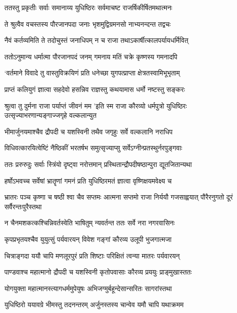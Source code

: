 \twolineshloka
{ततस्तु प्रकृतीः सर्वाः समानाय्य युधिष्ठिरः}
{सर्वमाचष्ट राजर्षिकीर्षितमथात्मनः}


\twolineshloka
{ते श्रुत्वैव वचस्तस्य पौरजानपदा जनाः}
{भृशमुद्विग्रमनसो नाभ्यनन्दन्त तद्वचः}


\twolineshloka
{नैवं कर्तव्यमिति ते तदोचुस्तं जनाधिपम्}
{न च राजा तथाऽकार्षीत्कालपर्यायधर्मिवित्}


\twolineshloka
{ततोऽनुमान्य धर्मात्मा पौरजानपदं जनम्}
{गमनाय मतिं चक्रे कृष्णस्य गमनादपि}


\twolineshloka
{`वर्तमाने विवादे तु वास्तुविक्रयिणं प्रति}
{धनेच्छा युगपत्प्राप्ता क्षेत्रतस्वामिभूभृताम्}


\twolineshloka
{प्राप्तं कलियुगं ज्ञात्वा सहदेवो हसन्निव}
{राज्ञस्तु कथयामास धर्मो नष्टस्तु सङ्करः}


\threelineshloka
{श्रुत्वा तु दुर्मना राजा पर्याप्तं जीवनं मम}
{'इति स्म राजा कौरव्यो धर्मपुत्रो युधिष्ठिरः}
{उत्सृज्याभरणान्यङ्गाज्जगृहे वल्कलान्युत}


\twolineshloka
{भीमार्जुनयमाश्चैव द्रौपदी च यशस्विनी}
{तथैव जगृहुः सर्वे वल्कलानि नराधिप}


\twolineshloka
{विधिवत्कारयित्वेष्टिं नैष्ठिकीं भरतर्षभ}
{समुत्सृज्याप्सु सर्वेऽग्नीन्प्रतस्थुर्नरपुङ्गवाः}


\twolineshloka
{ततः प्ररुरुदुः सर्वाः स्त्रिंयो दृष्ट्वा नरोत्तमान्}
{प्रस्थितान्द्रौपदीषष्ठान्पुरा द्यूतजितान्यथा}


\threelineshloka
{हर्षोऽभवच्च सर्वेषां भ्रातॄणां गमनं प्रति}
{युधिष्ठिरमतं ज्ञात्वा वृष्णिक्षयमवेक्ष्य च}
{}


\threelineshloka
{भ्रातरः पञ्च कृष्णा च षष्ठी श्वा चैव सप्तमः}
{आत्मना सप्तमो राजा निर्ययौ गजसाह्वयात्}
{पौरैरनुगतो दूरं सर्वैरन्तःपुरैस्तथा}


\twolineshloka
{न चैनमशकत्कश्चिन्निवर्तस्वेति भाषितुम्}
{न्यवर्तन्त ततः सर्वे नरा नगरवासिनः}


\twolineshloka
{कृपप्रभृतयश्चैव युयुत्सुं पर्यवारयन्}
{विवेश गङ्गां कौरव्य उलूपी भुजगात्मजा}


\twolineshloka
{चित्राङ्गदा ययौ चापि मणलूरपुरं प्रति}
{शिष्टाः परिक्षितं त्वन्या मातरः पर्यवारयन्}


\twolineshloka
{पाण्डवाश्च महात्मानो द्रौपदी च यशस्विनी}
{कृतोपवासाः कौरव्य प्रययुः प्राङ्मुखास्ततः}


\twolineshloka
{योगयुक्ता महात्मानस्त्यागधर्ममुपेयुषः}
{अभिजग्मुर्बहून्देसान्सरितः सागरांस्तथा}


\twolineshloka
{युधिष्ठिरो ययावग्रे भीमस्तु तदनन्तरम्}
{अर्जुनस्तस्य चान्वेव यमौ चापि यथाक्रमम}


